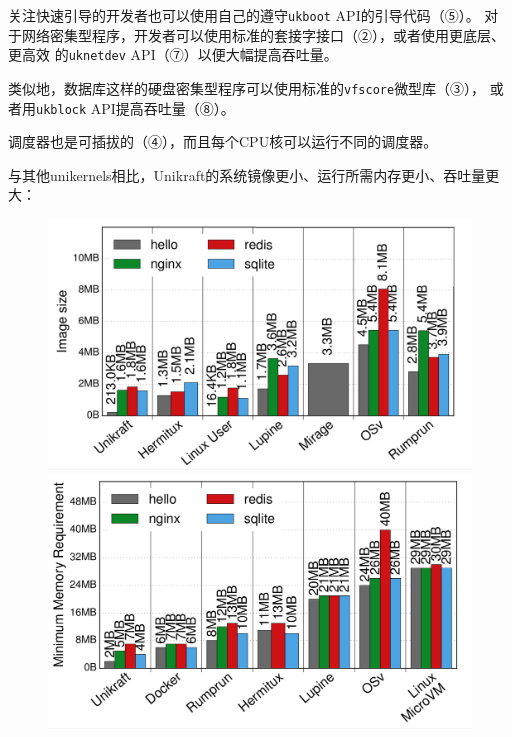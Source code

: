 \documentclass{../runikraft-report}
\begin{document}
关注快速引导的开发者也可以使用自己的遵守\texttt{ukboot} API的引导代码（⑤）。
对于网络密集型程序，开发者可以使用标准的套接字接口（②），或者使用更底层、更高效
的\texttt{uknetdev} API（⑦）以便大幅提高吞吐量。

类似地，数据库这样的硬盘密集型程序可以使用标准的\texttt{vfscore}微型库（③），
或者用\texttt{ukblock} API提高吞吐量（⑧）。

调度器也是可插拔的（④），而且每个CPU核可以运行不同的调度器。


与其他unikernels相比，Unikraft的系统镜像更小、运行所需内存更小、吞吐量更大：
\begin{figure}[H]
\centering
\begin{minipage}{0.32\linewidth}
\includegraphics[width=1\linewidth]{assets/Unikraft-image-size.png}
\caption{}
\label{fig:unikraft-image-size}
\end{minipage}
\begin{minipage}{0.32\linewidth}
\includegraphics[width=1\linewidth]{assets/Unikraft-memory.png}
\caption{}
\end{minipage}

\end{figure}
\end{document}
